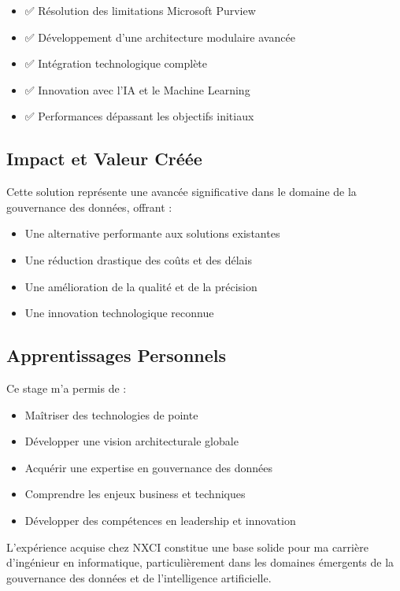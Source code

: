 \documentclass[a4paper,12pt]{article}
\begin{document}
\begin{itemize}
    \item ✅ Résolution des limitations Microsoft Purview
    \item ✅ Développement d'une architecture modulaire avancée
    \item ✅ Intégration technologique complète
    \item ✅ Innovation avec l'IA et le Machine Learning
    \item ✅ Performances dépassant les objectifs initiaux
\end{itemize}

\subsection*{Impact et Valeur Créée}

Cette solution représente une avancée significative dans le domaine de la gouvernance des données, offrant :
\begin{itemize}
    \item Une alternative performante aux solutions existantes
    \item Une réduction drastique des coûts et des délais
    \item Une amélioration de la qualité et de la précision
    \item Une innovation technologique reconnue
\end{itemize}

\subsection*{Apprentissages Personnels}

Ce stage m'a permis de :
\begin{itemize}
    \item Maîtriser des technologies de pointe
    \item Développer une vision architecturale globale
    \item Acquérir une expertise en gouvernance des données
    \item Comprendre les enjeux business et techniques
    \item Développer des compétences en leadership et innovation
\end{itemize}

L'expérience acquise chez NXCI constitue une base solide pour ma carrière d'ingénieur en informatique, particulièrement dans les domaines émergents de la gouvernance des données et de l'intelligence artificielle.
\end{document}
